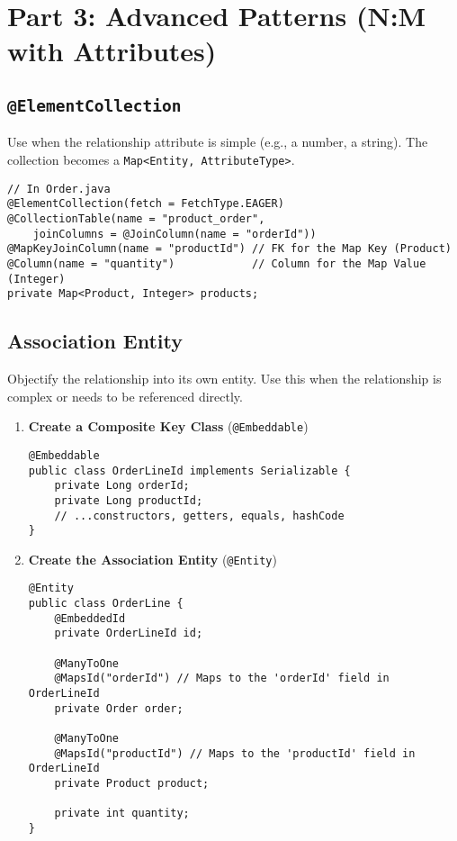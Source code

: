 \section*{Part 3: Advanced Patterns (N:M with Attributes)}
\subsection*{\texttt{@ElementCollection}}
Use when the relationship attribute is simple (e.g., a number, a string). The collection becomes a \texttt{Map<Entity, AttributeType>}.
\begin{lstlisting}
// In Order.java
@ElementCollection(fetch = FetchType.EAGER)
@CollectionTable(name = "product_order", 
    joinColumns = @JoinColumn(name = "orderId"))
@MapKeyJoinColumn(name = "productId") // FK for the Map Key (Product)
@Column(name = "quantity")            // Column for the Map Value (Integer)
private Map<Product, Integer> products;
\end{lstlisting}

\subsection*{Association Entity}
Objectify the relationship into its own entity. Use this when the relationship is complex or needs to be referenced directly.
\begin{enumerate}
    \item \textbf{Create a Composite Key Class} (\texttt{@Embeddable})
    \begin{lstlisting}
@Embeddable
public class OrderLineId implements Serializable {
    private Long orderId;
    private Long productId;
    // ...constructors, getters, equals, hashCode
}
    \end{lstlisting}
    \item \textbf{Create the Association Entity} (\texttt{@Entity})
    \begin{lstlisting}
@Entity
public class OrderLine {
    @EmbeddedId
    private OrderLineId id;

    @ManyToOne
    @MapsId("orderId") // Maps to the 'orderId' field in OrderLineId
    private Order order;

    @ManyToOne
    @MapsId("productId") // Maps to the 'productId' field in OrderLineId
    private Product product;

    private int quantity;
}
    \end{lstlisting}
\end{enumerate}
